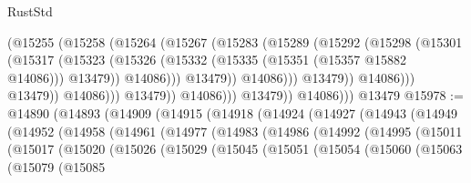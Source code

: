 \begin{lexlean}{RustStd}
\begin{coremodule}
                                      (@15255
                                        (@15258
                                          (@15264
                                            (@15267
                                              (@15283
                                                (@15289
                                                  (@15292
                                                    (@15298
                                                      (@15301
                                                        (@15317
                                                          (@15323
                                                            (@15326
                                                              (@15332
                                                                (@15335
                                                                  (@15351 (@15357 @15882 @14086)))
                                                                @13479))
                                                            @14086)))
                                                      @13479))
                                                  @14086)))
                                            @13479))
                                        @14086)))
                                  @13479))
                              @14086)))
                        @13479))
                    @14086)))
              @13479))
          @14086)))
    @13479
@15978 := @14890
    (@14893
      (@14909
        (@14915
          (@14918
            (@14924
              (@14927
                (@14943
                  (@14949
                    (@14952
                      (@14958
                        (@14961
                          (@14977
                            (@14983
                              (@14986
                                (@14992
                                  (@14995
                                    (@15011
                                      (@15017
                                        (@15020
                                          (@15026
                                            (@15029
                                              (@15045
                                                (@15051
                                                  (@15054
                                                    (@15060
                                                      (@15063
                                                        (@15079
                                                          (@15085

\end{coremodule}
\end{lexlean}
